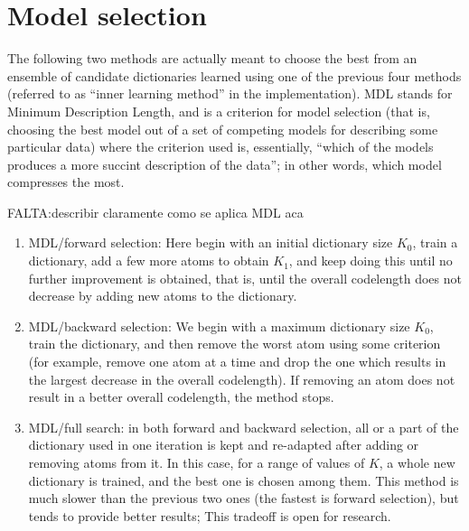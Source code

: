 \documentclass[twocolumn]{IEEEtran}
\newcommand{\falta}[1]{{\color{red}FALTA:#1}}
\begin{document}
\section{Model selection}


The following two methods are actually meant to choose the best from an ensemble of candidate dictionaries learned using one of the previous four methods (referred to as ``inner learning method'' in the implementation). MDL stands for Minimum Description Length, and is a criterion for model selection (that is, choosing the best model out of a set of competing models for describing some particular data) where the criterion used is, essentially, ``which of the models produces a more succint description of the data''; in other words, which model compresses the most.
 
\falta{describir claramente como se aplica MDL aca}
 
\begin{enumerate}
\item MDL/forward selection:  Here begin with an initial dictionary size $K_0$, train a dictionary, add a few more atoms to obtain $K_1$, and keep doing this until no further improvement is obtained, that is, until the overall codelength does not decrease by adding new atoms to the dictionary.
 
\item MDL/backward selection: We begin with a maximum dictionary size $K_0$, train the dictionary, and then remove the worst atom using some criterion (for example, remove one atom at a time and drop the one  which results in the largest decrease in the overall codelength). If removing an atom does not result in a better overall codelength, the method stops. 

\item MDL/full search: in both forward and backward selection, all or a part of the dictionary used in one iteration is kept and re-adapted after adding or removing atoms from it. In this case, for a range of values of $K$, a whole new dictionary is trained, and the best one is chosen among them. This method is much slower than the previous two ones (the fastest is forward selection), but tends to provide better results; This tradeoff is open for research.

\end{enumerate}
\end{document}
